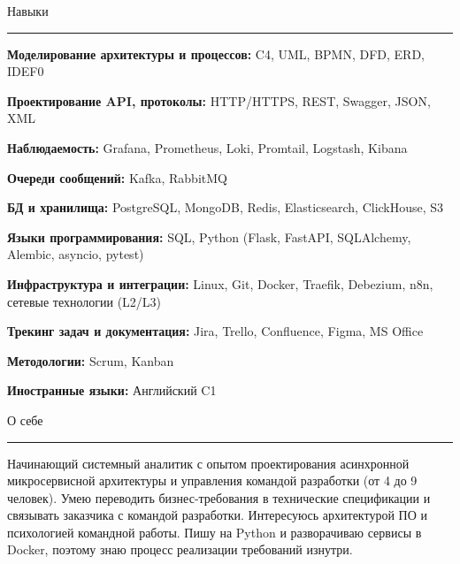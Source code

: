 \documentclass[14pt, a4paper, oneside]{extarticle}
\begin{document}
\begin{flushleft}
	\vspace{-\intextsep}
	\large Навыки
\end{flushleft}

\vspace{-0.8\intextsep}
\hrule


\vspace{0.5\intextsep}

\textbf{Моделирование архитектуры и процессов:} C4, UML, BPMN, DFD, ERD, IDEF0

\textbf{Проектирование API, протоколы:} HTTP/HTTPS, REST, Swagger, JSON, XML

\textbf{Наблюдаемость:} Grafana, Prometheus, Loki, Promtail, Logstash, Kibana

\textbf{Очереди сообщений:} Kafka, RabbitMQ

\textbf{БД и хранилища:} PostgreSQL, MongoDB, Redis, Elasticsearch, ClickHouse, S3

\textbf{Языки программирования:} SQL, Python (Flask, FastAPI, SQLAlchemy, Alembic, asyncio, pytest)

\textbf{Инфраструктура и интеграции:} Linux, Git, Docker, Traefik, Debezium, n8n, сетевые технологии (L2/L3)

\textbf{Трекинг задач и документация:} Jira, Trello, Confluence, Figma, MS Office

\textbf{Методологии:} Scrum, Kanban 

\textbf{Иностранные языки:} Английский C1


\begin{flushleft}
	\vspace{-\intextsep}
	\large О себе
\end{flushleft}

\vspace{-0.8\intextsep}
\hrule

\begin{sloppypar}
	\vspace{0.5\intextsep}
	\quad
	Начинающий системный аналитик с опытом проектирования асинхронной микросервисной архитектуры и управления командой разработки (от 4 до 9 человек). Умею переводить бизнес-требования в технические спецификации и связывать заказчика с командой разработки. Интересуюсь архитектурой ПО и психологией командной работы. Пишу на Python и разворачиваю сервисы в Docker, поэтому знаю процесс реализации требований изнутри. 
\end{sloppypar}
\end{document}
